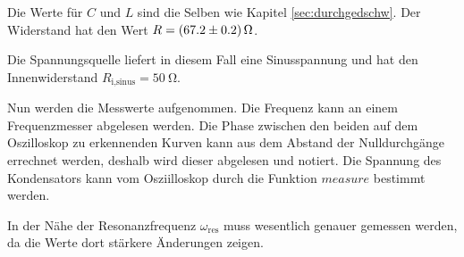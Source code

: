Die Werte für $C$ und $L$ sind die Selben wie Kapitel \ref{sec:durchgedschw}.
Der Widerstand hat den Wert $R = \SI{67.2 \pm 0.2}{\ohm}$.

Die Spannungsquelle liefert in diesem Fall eine Sinusspannung und hat
den Innenwiderstand $R_{\text{i,sinus}} = \SI{50}{\ohm}$.

Nun werden die Messwerte aufgenommen. Die Frequenz kann an einem Frequenzmesser
abgelesen werden. Die Phase zwischen den beiden auf dem Oszilloskop zu erkennenden
Kurven kann aus dem Abstand der Nulldurchgänge errechnet werden, deshalb wird dieser
abgelesen und notiert. Die Spannung des Kondensators kann vom Osziilloskop
durch die Funktion $measure$ bestimmt werden.

In der Nähe der Resonanzfrequenz $\omega_{\text{res}}$ muss wesentlich
genauer gemessen werden, da die Werte dort stärkere Änderungen zeigen.
